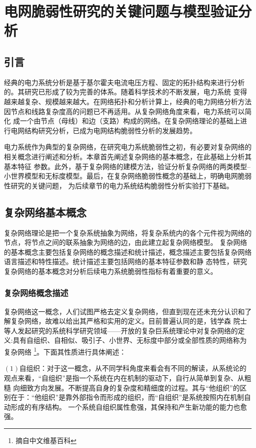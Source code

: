 \chapter{电网脆弱性研究的关键问题与模型验证分析}
\label{cha:model}

\section{引言}
\label{sec:index2}
经典的电力系统分析是基于基尔霍夫电流电压方程、固定的拓扑结构来进行分析的。其研究已形成了较为完善的体系\cite{refs60}。随着科学技术的不断发展，电力系统
变得越来越复杂、规模越来越大。在网络拓扑和分析计算上，经典的电力网络分析方法因节点和线路复杂度高的问题已不再适用。从复杂网络角度来看，电力系统可以简化
成一个由节点（母线）和边（支路）构成的网络。在复杂网络理论的基础上进行电网结构研究分析，已成为电网结构脆弱性分析的发展趋势。

电力系统作为典型的复杂网络，在研究电力系统脆弱性之初，有必要对复杂网络的相关概念进行阐述和分析。本章首先阐述复杂网络的基本概念，在此基础上分析其基本特征
参数。此外，基于复杂网络的建模方法，验证分析复杂网络的两类模型--小世界模型和无标度模型。最后，在复杂网络脆弱性概念的基础上，明确电网脆弱性研究的关键问题，
为后续章节的电力系统结构脆弱性分析实验打下基础。

\section{复杂网络基本概念}
\label{sec:powersys}
复杂网络理论是把一个复杂系统抽象为网络，将复杂系统内的各个元件视为网络的节点，将节点之间的联系抽象为网络的边，由此建立起复杂网络模型。
复杂网络的基本概念主要包括复杂网络的概念描述和统计描述，概念描述主要包括复杂网络语言描述和特性描述。统计描述主要包括网络的基本特征参数和静
态特性，研究复杂网络的基本概念对分析后续电力系统脆弱性指标有着重要的意义。

\subsection{复杂网络概念描述}
\label{sec:composite}
复杂网络这一概念，人们试图严格去定义复杂网络，但直到现在还未充分认识和了解复杂网络，故难以给出其严格和实用的定义\cite{refs31}。目前普遍认同的是，钱学森
院士等人发起研究的系统科学研究领域——开放的复杂巨系统理论中对复杂网络的定义:具有自组织、自相似、吸引子、小世界、无标度中部分或全部性质的网络称为复杂网络
\footnote{摘自中文维基百科}。下面其性质进行具体阐述：

$(1)$自组织：对于这一概念，从不同学科角度来看会有不同的解读，从系统论的观点来看，“自组织”是指一个系统在内在机制的驱动下，自行从简单到复杂、从粗糙
向细致方向发展。不断提高自身的复杂度和精细度的过程。其与“他组织”的区别在于：“他组织”是靠外部指令而形成的组织，而“自组织”是系统按照内在机制自动形成的有序结构。
一个系统自组织属性愈强，其保持和产生新功能的能力也愈强。

